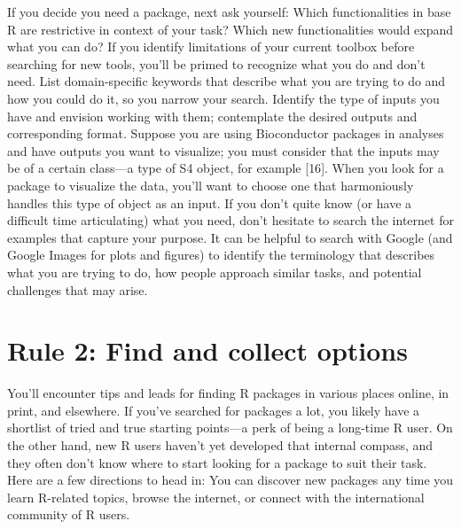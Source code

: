 \documentclass[10pt,letterpaper]{article}
\begin{document}
If you decide you need a package, next ask yourself: Which
functionalities in base R are restrictive in context of your task? Which
new functionalities would expand what you can do? If you identify
limitations of your current toolbox before searching for new tools,
you'll be primed to recognize what you do and don't need. List
domain-specific keywords that describe what you are trying to do and how
you could do it, so you narrow your search. Identify the type of inputs
you have and envision working with them; contemplate the desired outputs
and corresponding format. Suppose you are using Bioconductor packages in
analyses and have outputs you want to visualize; you must consider that
the inputs may be of a certain class---a type of S4 object, for example
{[}16{]}. When you look for a package to visualize the data, you'll want
to choose one that harmoniously handles this type of object as an input.
If you don't quite know (or have a difficult time articulating) what you
need, don't hesitate to search the internet for examples that capture
your purpose. It can be helpful to search with Google (and Google Images
for plots and figures) to identify the terminology that describes what
you are trying to do, how people approach similar tasks, and potential
challenges that may arise.

\hypertarget{rule-2-find-and-collect-options}{%
\section{Rule 2: Find and collect
options}\label{rule-2-find-and-collect-options}}

You'll encounter tips and leads for finding R packages in various places
online, in print, and elsewhere. If you've searched for packages a lot,
you likely have a shortlist of tried and true starting points---a perk
of being a long-time R user. On the other hand, new R users haven't yet
developed that internal compass, and they often don't know where to
start looking for a package to suit their task. Here are a few
directions to head in: You can discover new packages any time you learn
R-related topics, browse the internet, or connect with the international
community of R users.
\end{document}
